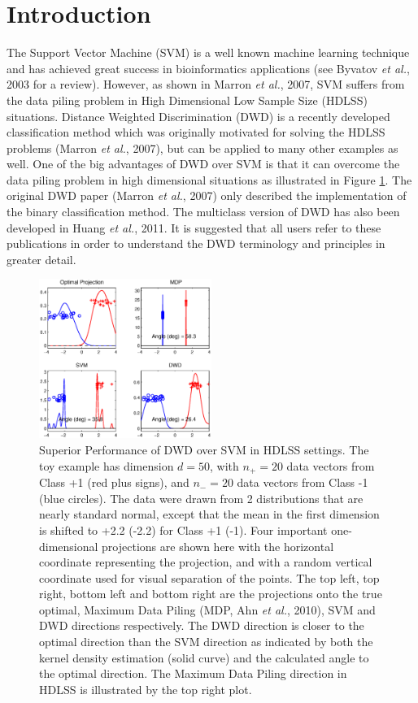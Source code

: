 \documentclass{bioinfo}
\begin{document}
\section{Introduction}

The Support Vector Machine (SVM) is a well known machine learning technique and
has achieved great success in bioinformatics applications (see Byvatov {\em et
al.}, 2003 for a review). However, as shown in Marron {\em et al.}, 2007, SVM
suffers from the data piling problem in High Dimensional Low Sample Size (HDLSS) situations.
Distance Weighted Discrimination (DWD) is a recently developed classification
method which was originally motivated for solving the HDLSS problems (Marron
{\em et al.}, 2007), but can be applied to many other examples as well. One of
the big advantages of DWD over SVM is that it can overcome the data piling problem
in high dimensional situations as illustrated in Figure \ref{dwdsvm}. The
original DWD paper (Marron {\em et al.}, 2007) only described the
implementation of the binary classification method. The multiclass version of
DWD has also been developed in Huang {\em et al.}, 2011. It is suggested that
all users refer to these publications in order to understand the DWD terminology
and principles in greater detail.

\begin{figure}[ht]
\begin{center}
\includegraphics[keepaspectratio=true, width=0.5\textwidth]{mdp.ps}
\caption{Superior Performance of DWD over SVM in HDLSS settings. The toy example
has dimension $d=50$, with $n_+=20$ data vectors from Class +1 (red plus
signs), and $n_-=20$ data vectors from Class -1 (blue circles). The
data were drawn from 2 distributions that are nearly standard normal, except
that the mean in the first dimension is shifted to +2.2 (-2.2) for Class +1
(-1). Four important one-dimensional projections are shown here with the
horizontal coordinate representing the projection, and with a random vertical
coordinate used for visual separation of the points. The top left, top right,
bottom left and bottom right are the projections onto the true optimal, Maximum
Data Piling (MDP, Ahn {\em et al.}, 2010), SVM and DWD directions
respectively. The DWD direction is closer to the optimal direction than the SVM
direction as indicated by both the kernel density estimation (solid curve) and
the calculated angle to the optimal direction. The Maximum Data Piling direction in HDLSS is illustrated by
the top right plot.}
\end{center}
\label{dwdsvm}
\end{figure}
\end{document}
